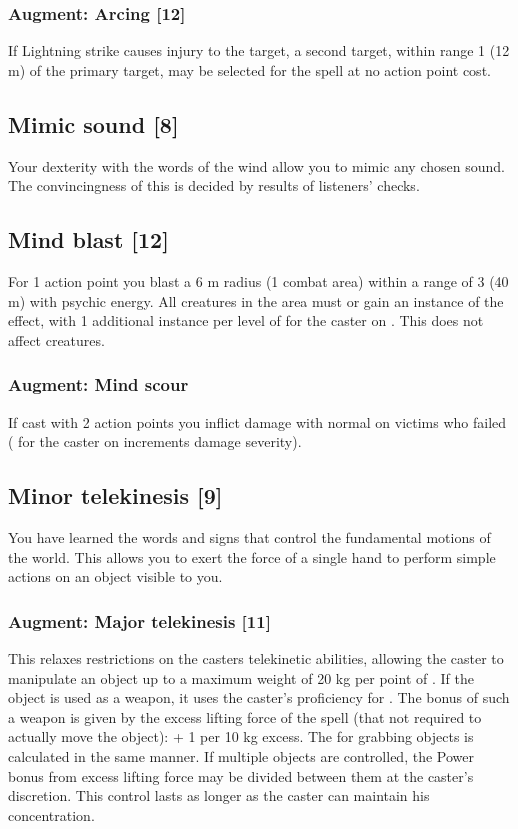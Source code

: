 \subsubsection{Augment: Arcing [12]}
If Lightning strike causes injury to the target, a second target, within range 1 (12 m) of the primary target, may be selected for the spell at no action point cost. 

\subsection{Mimic sound [8]}
Your dexterity with the words of the wind allow you to mimic any chosen sound. The convincingness of this is decided by results of listeners'  checks.

\subsection{Mind blast [12]}
For 1 action point you blast a 6 m radius (1 combat area) within a range of 3 (40 m) with psychic energy. All creatures in the area must  or gain an instance of the  effect, with 1 additional instance per level of  for the caster on . This does not affect  creatures.
\subsubsection{Augment: Mind scour}
If cast with 2 action points you inflict damage with normal  on victims who failed  ( for the caster on  increments damage severity).

\subsection{Minor telekinesis [9]}
\label{spell:min-tele}
You have learned the words and signs that control the fundamental motions of the world. This allows you to exert the force of a single hand to perform simple actions on an object visible to you.
\subsubsection{Augment: Major telekinesis [11]}
This relaxes restrictions on the casters telekinetic abilities, allowing the caster to manipulate an object up to a maximum weight of 20 kg per point of . If the object is used as a weapon, it uses the caster's  proficiency for . The bonus  of such a weapon is given by the excess lifting force of the spell (that not required to actually move the object):  + 1 per 10 kg excess. The  for grabbing objects is calculated in the same manner. If multiple objects are controlled, the Power bonus from excess lifting force may be divided between them at the caster's discretion. This control lasts as longer as the caster can maintain his concentration.

